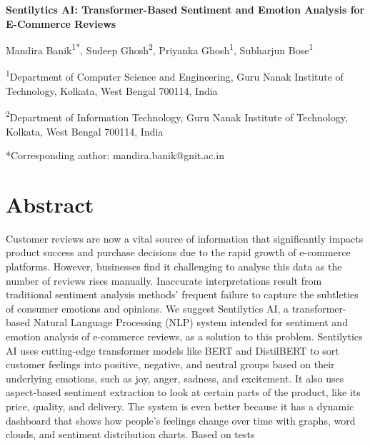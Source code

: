 \documentclass[11pt,a4paper]{article}
\begin{document}
\begin{center}
\textbf{\fontsize{16}{19}\selectfont Sentilytics AI: Transformer-Based Sentiment and Emotion Analysis for E-Commerce Reviews}
\end{center}

\vspace{12pt}

\begin{center}
\fontsize{11}{13}\selectfont
Mandira Banik\textsuperscript{1*}, Sudeep Ghosh\textsuperscript{2}, Priyanka Ghosh\textsuperscript{1}, Subharjun Bose\textsuperscript{1}

\vspace{6pt}

\fontsize{9}{11}\selectfont
\textsuperscript{1}Department of Computer Science and Engineering, Guru Nanak Institute of Technology, Kolkata, West Bengal 700114, India

\textsuperscript{2}Department of Information Technology, Guru Nanak Institute of Technology, Kolkata, West Bengal 700114, India

\vspace{6pt}

*Corresponding author: mandira.banik@gnit.ac.in
\end{center}

\vspace{12pt}

\section*{Abstract}

Customer reviews are now a vital source of information that significantly impacts product success and purchase decisions due to the rapid growth of e-commerce platforms. However, businesses find it challenging to analyse this data as the number of reviews rises manually. Inaccurate interpretations result from traditional sentiment analysis methods' frequent failure to capture the subtleties of consumer emotions and opinions. We suggest Sentilytics AI, a transformer-based Natural Language Processing (NLP) system intended for sentiment and emotion analysis of e-commerce reviews, as a solution to this problem. Sentilytics AI uses cutting-edge transformer models like BERT and DistilBERT to sort customer feelings into positive, negative, and neutral groups based on their underlying emotions, such as joy, anger, sadness, and excitement. It also uses aspect-based sentiment extraction to look at certain parts of the product, like its price, quality, and delivery. The system is even better because it has a dynamic dashboard that shows how people's feelings change over time with graphs, word clouds, and sentiment distribution charts. Based on tests
\end{document}
